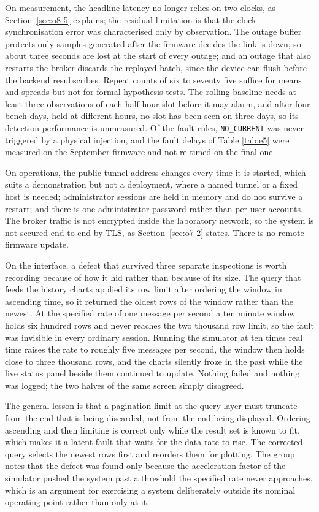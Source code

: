 On measurement, the headline latency no longer relies on two clocks, as Section~\ref{sec:o8-5} explains; the residual limitation is that the clock synchronisation error was characterised only by observation. The outage buffer protects only samples generated after the firmware decides the link is down, so about three seconds are lost at the start of every outage; and an outage that also restarts the broker discards the replayed batch, since the device can flush before the backend resubscribes. Repeat counts of six to seventy five suffice for means and spreads but not for formal hypothesis tests. The rolling baseline needs at least three observations of each half hour slot before it may alarm, and after four bench days, held at different hours, no slot has been seen on three days, so its detection performance is unmeasured. Of the fault rules, \texttt{NO\_CURRENT} was never triggered by a physical injection, and the fault delays of Table \ref{tab:e5} were measured on the September firmware and not re-timed on the final one.

On operations, the public tunnel address changes every time it is started, which suits a demonstration but not a deployment, where a named tunnel or a fixed host is needed; administrator sessions are held in memory and do not survive a restart; and there is one administrator password rather than per user accounts. The broker traffic is not encrypted inside the laboratory network, so the system is not secured end to end by TLS, as Section~\ref{sec:o7-2} states. There is no remote firmware update.

On the interface, a defect that survived three separate inspections is worth recording because of how it hid rather than because of its size. The query that feeds the history charts applied its row limit after ordering the window in ascending time, so it returned the oldest rows of the window rather than the newest. At the specified rate of one message per second a ten minute window holds six hundred rows and never reaches the two thousand row limit, so the fault was invisible in every ordinary session. Running the simulator at ten times real time raises the rate to roughly five messages per second, the window then holds close to three thousand rows, and the charts silently froze in the past while the live status panel beside them continued to update. Nothing failed and nothing was logged; the two halves of the same screen simply disagreed.

The general lesson is that a pagination limit at the query layer must truncate from the end that is being discarded, not from the end being displayed. Ordering ascending and then limiting is correct only while the result set is known to fit, which makes it a latent fault that waits for the data rate to rise. The corrected query selects the newest rows first and reorders them for plotting. The group notes that the defect was found only because the acceleration factor of the simulator pushed the system past a threshold the specified rate never approaches, which is an argument for exercising a system deliberately outside its nominal operating point rather than only at it.

